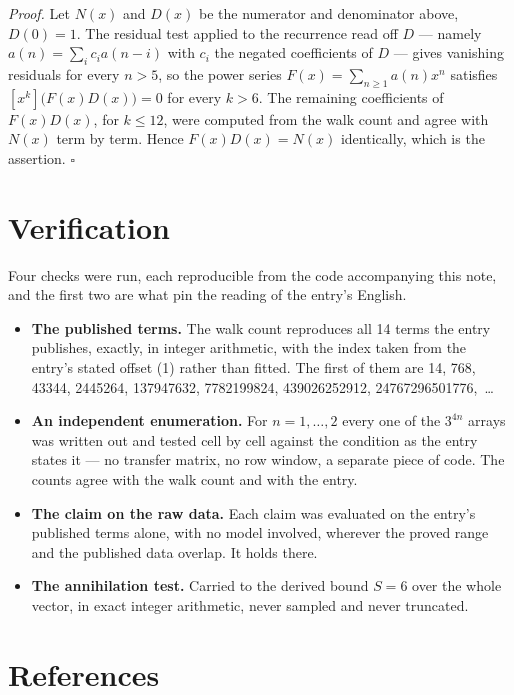 \documentclass[11pt]{article}
\theoremstyle{definition}
\begin{document}
{\itshape Proof.} Let $N(x)$ and $D(x)$ be the numerator and denominator above, $D(0)=1$. The residual test applied to the recurrence read off $D$ --- namely $a(n) = \sum_i c_i a(n-i)$ with $c_i$ the negated coefficients of $D$ --- gives vanishing residuals for every $n > 5$, so the power series $F(x)=\sum_{n\ge 1}a(n)x^n$ satisfies $[x^k]\bigl(F(x)D(x)\bigr) = 0$ for every $k > 6$. The remaining coefficients of $F(x)D(x)$, for $k \le 12$, were computed from the walk count and agree with $N(x)$ term by term. Hence $F(x)D(x) = N(x)$ identically, which is the assertion. $\square$

\section{Verification}

Four checks were run, each reproducible from the code accompanying this note, and the first two are what pin the reading of the entry's English.

\begin{itemize}

\item {\bfseries The published terms.} The walk count reproduces all 14 terms the entry publishes, exactly, in integer arithmetic, with the index taken from the entry's stated offset (1) rather than fitted. The first of them are 14, 768, 43344, 2445264, 137947632, 7782199824, 439026252912, 24767296501776,~\dots

\item {\bfseries An independent enumeration.} For $n = 1,\dots,2$ every one of the $3^{4n}$ arrays was written out and tested cell by cell against the condition as the entry states it --- no transfer matrix, no row window, a separate piece of code. The counts agree with the walk count and with the entry.

\item {\bfseries The claim on the raw data.} Each claim was evaluated on the entry's published terms alone, with no model involved, wherever the proved range and the published data overlap. It holds there.

\item {\bfseries The annihilation test.} Carried to the derived bound $S = 6$ over the whole vector, in exact integer arithmetic, never sampled and never truncated.

\end{itemize}

\section{References}
\end{document}
